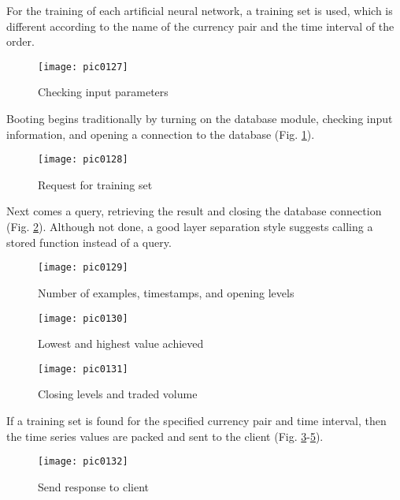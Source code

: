 For the training of each artificial neural network, a training set is used, which is different according to the name of the currency pair and the time interval of the order.

\begin{figure}[h]
\centering
\texttt{[image: pic0127]}
\caption{Checking input parameters}
\label{fig:pic0127}
\end{figure}
\FloatBarrier

Booting begins traditionally by turning on the database module, checking input information, and opening a connection to the database (Fig. \ref{fig:pic0127}).

\begin{figure}[h]
\centering
\texttt{[image: pic0128]}
\caption{Request for training set}
\label{fig:pic0128}
\end{figure}
\FloatBarrier

Next comes a query, retrieving the result and closing the database connection (Fig. \ref{fig:pic0128}). Although not done, a good layer separation style suggests calling a stored function instead of a query.

\begin{figure}[h]
\centering
\texttt{[image: pic0129]}
\caption{Number of examples, timestamps, and opening levels}
\label{fig:pic0129}
\end{figure}
\FloatBarrier

\begin{figure}[h]
\centering
\texttt{[image: pic0130]}
\caption{Lowest and highest value achieved}
\label{fig:pic0130}
\end{figure}
\FloatBarrier

\begin{figure}[h]
\centering
\texttt{[image: pic0131]}
\caption{Closing levels and traded volume}
\label{fig:pic0131}
\end{figure}
\FloatBarrier

If a training set is found for the specified currency pair and time interval, then the time series values are packed and sent to the client (Fig. \ref{fig:pic0129}-\ref{fig:pic0131}).

\begin{figure}[h]
\centering
\texttt{[image: pic0132]}
\caption{Send response to client}
\label{fig:pic0132}
\end{figure}
\FloatBarrier

